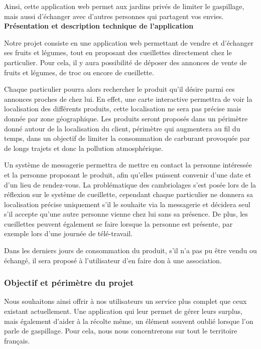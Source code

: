 \documentclass{article}
\begin{document}
Ainsi, cette application web permet aux jardins privés de limiter le gaspillage, mais aussi d'échanger avec d'autres personnes qui partagent vos envies.
\vspace{1cm}
\newline
\textbf{Présentation et description technique de l'application}

Notre projet consiste en une application web permettant de vendre et d'échanger ses fruits et légumes, tout en proposant des cueillettes directement chez le particulier. Pour cela, il y aura possibilité de déposer des annonces de vente de fruits et légumes, de troc ou encore de cueillette. 

Chaque particulier pourra alors rechercher le produit qu'il désire parmi ces annonces proches de chez lui. En effet, une carte interactive permettra de voir la localisation des différents produits, cette localisation ne sera pas précise mais donnée par zone géographique. Les produits seront proposés dans un périmètre donné autour de la localisation du client, périmètre qui augmentera au fil du temps, dans un objectif de limiter la consommation de carburant provoquée par de longs trajets et donc la pollution atmosphérique. 

Un système de messagerie permettra de mettre en contact la personne intéressée et la personne proposant le produit, afin qu'elles puissent convenir d'une date et d'un lieu de rendez-vous. 
La problématique des cambriolages s'est posée lors de la réflexion sur le système de cueillette, cependant chaque particulier ne donnera sa localisation précise uniquement s'il le souhaite via la messagerie et décidera seul s'il accepte qu'une autre personne vienne chez lui sans sa présence. De plus, les cueillettes peuvent également se faire lorsque la personne est présente, par exemple lors d'une journée de télé-travail.

Dans les derniers jours de consommation du produit, s'il n'a pas pu être vendu ou échangé, il sera proposé à l'utilisateur d'en faire don à une association. 

\subsubsection{Objectif et périmètre du projet}

Nous souhaitons ainsi offrir à nos utilisateurs un service plus complet que ceux existant actuellement. Une application qui leur permet de gérer leurs surplus, mais également d'aider à la récolte même, un élément souvent oublié lorsque l'on parle de gaspillage.
Pour cela, nous nous concentrerons sur tout le territoire français.
\end{document}
